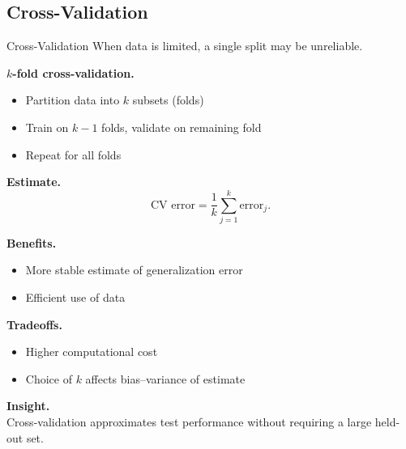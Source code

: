 \documentclass[aspectratio=169,11pt]{beamer}
\begin{document}
\subsection{Cross-Validation}
\begin{frame}[t,allowframebreaks]{Cross-Validation}
\small
When data is limited, a single split may be unreliable.

\textbf{$k$-fold cross-validation.}\\ \begin{itemize}
    \item Partition data into $k$ subsets (folds)
    \item Train on $k-1$ folds, validate on remaining fold
    \item Repeat for all folds
\end{itemize}

\textbf{Estimate.}\\ \[
\text{CV error} = \frac{1}{k} \sum_{j=1}^k \text{error}_j.
\]

\textbf{Benefits.}\\ \begin{itemize}
    \item More stable estimate of generalization error
    \item Efficient use of data
\end{itemize}

\textbf{Tradeoffs.}\\ \begin{itemize}
    \item Higher computational cost
    \item Choice of $k$ affects bias–variance of estimate
\end{itemize}

\textbf{Insight.}\\ Cross-validation approximates test performance without requiring a large held-out set.
\end{frame}
\end{document}
